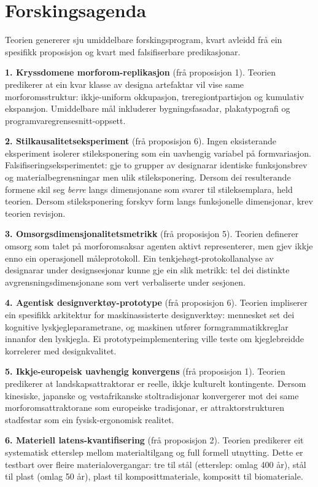 \section{Forskingsagenda}
\label{sec:agenda-nn}

Teorien genererer sju umiddelbare forskingsprogram, kvart avleidd frå ein spesifikk proposisjon og kvart med falsifiserbare predikasjonar.

\textbf{1. Kryssdomene morforom-replikasjon} (frå proposisjon 1). Teorien predikerer at ein kvar klasse av designa artefaktar vil vise same morforomsstruktur: ikkje-uniform okkupasjon, treregiontpartisjon og kumulativ ekspansjon. Umiddelbare mål inkluderer bygningsfasadar, plakatypografi og programvaregrensesnitt-oppsett.

\textbf{2. Stilkausalitetseksperiment} (frå proposisjon 6). Ingen eksisterande eksperiment isolerer stileksponering som ein uavhengig variabel på formvariasjon. Falsifiseringseksperimentet: gje to grupper av designarar identiske funksjonsbrev og materialbegrensningar men ulik stileksponering. Dersom dei resulterande formene skil seg \textit{berre} langs dimensjonane som svarer til stileksemplara, held teorien. Dersom stileksponering forskyv form langs funksjonelle dimensjonar, krev teorien revisjon.

\textbf{3. Omsorgsdimensjonalitetsmetrikk} (frå proposisjon 5). Teorien definerer omsorg som talet på morforomsaksar agenten aktivt representerer, men gjev ikkje enno ein operasjonell måleprotokoll. Ein tenkjehøgt-protokollanalyse av designarar under designsesjonar kunne gje ein slik metrikk: tel dei distinkte avgrensningsdimensjonane som vert verbaliserte under sesjonen.

\textbf{4. Agentisk designverktøy-prototype} (frå proposisjon 6). Teorien impliserer ein spesifikk arkitektur for maskinassisterte designverktøy: mennesket set dei kognitive lyskjegleparametrane, og maskinen utfører formgrammatikkreglar innanfor den lyskjegla. Ei prototypeimplementering ville teste om kjeglebreidde korrelerer med designkvalitet.

\textbf{5. Ikkje-europeisk uavhengig konvergens} (frå proposisjon 1). Teorien predikerer at landskapsattraktorar er reelle, ikkje kulturelt kontingente. Dersom kinesiske, japanske og vestafrikanske stoltradisjonar konvergerer mot dei same morforomsattraktorane som europeiske tradisjonar, er attraktorstrukturen stadfestar som ein fysisk-ergonomisk realitet.

\textbf{6. Materiell latens-kvantifisering} (frå proposisjon 2). Teorien predikerer eit systematisk etterslep mellom materialtilgang og full formell utnytting. Dette er testbart over fleire materialovergangar: tre til stål (etterslep: omlag 400 år), stål til plast (omlag 50 år), plast til komposittmateriale, kompositt til biomateriale.

